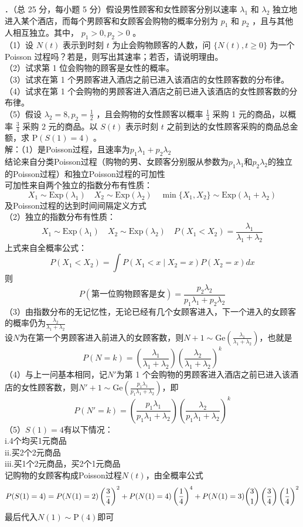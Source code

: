 \documentclass[UTF8,openany]{book}
\begin{document}
．（总 25 分，每小题 5 分）假设男性顾客和女性顾客分别以速率 $\lambda_{1}$ 和 $\lambda_{2}$ 独立地进入某个酒店，而每个男顾客和女顾客会购物的概率分别为 $p_{1}$ 和 $p_{2}$ ，且与其他人相互独立。其中， $p_{1}>0, p_{2}>0$ 。\\
（1）设 $N(t)$ 表示到时刻 $t$ 为止会购物顾客的人数，问 $\{N(t), t \geqslant 0\}$ 为一个 Poisson 过程吗？若是，则写出其速率；若否，请说明理由。\\
（2）试求第 1 位会购物的顾客是女性的概率。\\
（3）试求在第 1 个男顾客进入酒店之前已进入该酒店的女性顾客数的分布律。\\
（4）试求在第 1 个会购物的男顾客进入酒店之前已进入该酒店的女性顾客数的分布律。\\
（5）假设 $\lambda_{2}=8, p_{2}=\frac{1}{2}$ ，且会购物的女性顾客以概率 $\frac{1}{4}$ 采购 1 元的商品，以概率 $\frac{3}{4}$ 采购 2 元的商品。以 $S(t)$ 表示时刻 $t$ 之前到达的女性顾客采购的商品总金额，求 $\mathrm{P}(S(1)=4)$ 。\\
解：（1）是Poisson过程，且速率为$p_1\lambda_1+p_2\lambda_2$\\
结论来自分类Poisson过程（购物的男、女顾客分别服从参数为$p_1\lambda_1$和$p_2\lambda_2$的独立的Poisson过程）和独立Poisson过程的可加性\\
可加性来自两个独立的指数分布有性质：
\[
X_1 \sim \mathrm{Exp}(\lambda_1) \quad X_2 \sim \mathrm{Exp}(\lambda_2) \quad 
\min\{X_1,X_2\} \sim \mathrm{Exp}(\lambda_1+\lambda_2)
\]
及Poisson过程的达到时间间隔定义方式\\
（2）独立的指数分布有性质：
\[
X_1 \sim \mathrm{Exp}(\lambda_1) \quad X_2 \sim \mathrm{Exp}(\lambda_2) \quad P(X_1<X_2)=\frac{\lambda_1}{\lambda_1+\lambda_2}
\]
上式来自全概率公式：
\[
P(X_1<X_2)=\int P(X_1<x\mid X_2=x)P(X_2=x)dx
\]
则
\[
P(\text{第一位购物顾客是女})=\frac{p_2\lambda_2}{p_1\lambda_1+p_2\lambda_2}
\]
（3）由指数分布的无记忆性，无论已经有几个女顾客进入，下一个进入的女顾客的概率仍为$\frac{\lambda_2}{\lambda_1+\lambda_2}$\\
设$N$为在第一个男顾客进入前进入的女顾客数，则$N+1\sim \mathrm{Ge}\left( \frac{\lambda_1}{\lambda_1+\lambda_2}\right) $，也就是
\[
P(N=k)=\left(  \frac{\lambda_1}{\lambda_1+\lambda_2}\right)\left( \frac{\lambda_2}{\lambda_1+\lambda_2}\right)^k
\]
（4）与上一问基本相同，记$N'$为第 1 个会购物的男顾客进入酒店之前已进入该酒店的女性顾客数，则$N'+1\sim \mathrm{Ge}\left( \frac{p_1\lambda_1}{p_1\lambda_1+\lambda_2}\right) $，即
\[
P(N'=k)=\left(  \frac{p_1\lambda_1}{p_1\lambda_1+\lambda_2}\right)\left( \frac{\lambda_2}{p_1\lambda_1+\lambda_2}\right)^k
\]
（5）$S(1)=4$有以下情况：\\
i.4个均买1元商品\\
ii.买2个2元商品\\
iii.买1个2元商品，买2个1元商品\\
记购物的女顾客构成Poisson过程$N(t)$，由全概率公式
\[
P(S(1)=4)=P(N(1)=2)\left( \frac{3}{4}\right)^2+P(N(1)=4)\left(\frac{1}{4} \right)^4+P(N(1)=3)\dbinom{3}{1} \left( \frac{3}{4}\right) \left(\frac{1}{4} \right)^2 
\]
最后代入$N(1)\sim \mathrm{P}(4)$即可\\
\end{document}
